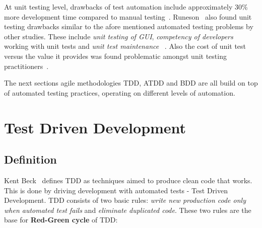     At unit testing level, drawbacks of test automation include approximately 30\% more development time compared to manual testing~\cite{williams2009effectiveness}.
    Runeson~\cite{runeson2006survey} also found unit testing drawbacks similar to the afore mentioned automated testing problems by other studies.
    These include \textit{unit testing of GUI}, \textit{competency of developers} working with unit tests and \textit{unit test maintenance}~\cite{runeson2006survey} .
    Also the cost of unit test versus the value it provides was found problematic amongst unit testing practitioners~\cite{runeson2006survey}.

    The next sections agile methodologies TDD, ATDD and BDD are all build on top of automated testing practices, operating on different levels
    of automation.

\section{Test Driven Development} %
    \subsection{Definition}
    Kent Beck~\cite{beck2003test} defines TDD as techniques aimed to produce clean code that works.
    This is done by driving development with automated tests - Test Driven Development. TDD consists of two basic rules:
    \textit{write new production code only when automated test fails} and
    \textit{eliminate duplicated code}. These two rules are the base for \textbf{Red-Green cycle} of TDD:

